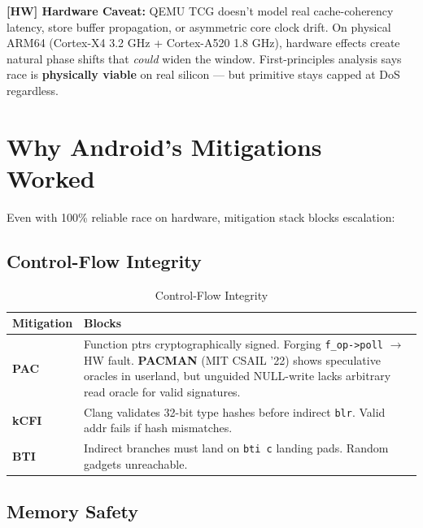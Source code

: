\documentclass[11pt,a4paper]{article}
\begin{document}
\begin{dangerbox}
\noindent\textbf{[HW] Hardware Caveat:} QEMU TCG doesn't model real cache-coherency latency, store buffer propagation, or asymmetric core clock drift. On physical ARM64 (Cortex-X4 3.2 GHz + Cortex-A520 1.8 GHz), hardware effects create natural phase shifts that \textit{could} widen the window. First-principles analysis says race is \textbf{physically viable} on real silicon --- but primitive stays capped at DoS regardless.
\end{dangerbox}

\newpage

\section{Why Android's Mitigations Worked}

Even with 100\% reliable race on hardware, mitigation stack blocks escalation:

\subsection{Control-Flow Integrity}

\begin{table}[H]
\centering
\caption{Control-Flow Integrity}
\begin{tabularx}{\textwidth}{>{\bfseries\color{accent}}l X}
\toprule
\textbf{Mitigation} & \textbf{Blocks} \\
\midrule
\textbf{PAC} & Function ptrs cryptographically signed. Forging \texttt{f\_op->poll} $\to$ HW fault. \textbf{PACMAN} (MIT CSAIL '22) shows speculative oracles in userland, but unguided NULL-write lacks arbitrary read oracle for valid signatures. \\
\textbf{kCFI} & Clang validates 32-bit type hashes before indirect \texttt{blr}. Valid addr fails if hash mismatches. \\
\textbf{BTI} & Indirect branches must land on \texttt{bti c} landing pads. Random gadgets unreachable. \\
\bottomrule
\end{tabularx}
\end{table}

\subsection{Memory Safety}
\end{document}
